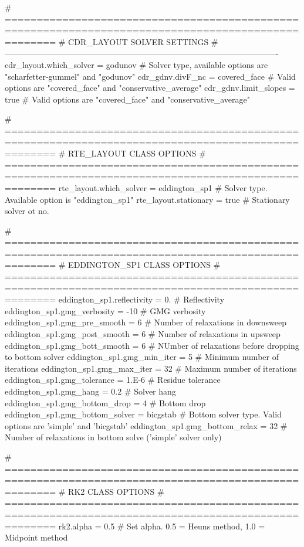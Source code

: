 \begin{DoxyVerb}
  # ====================================================================================================
  # CDR_LAYOUT SOLVER SETTINGS
  # ----------------------------------------------------------------------------------------------------
  cdr_layout.which_solver = godunov                # Solver type, available options are "scharfetter-gummel" and "godunov"
  cdr_gdnv.divF_nc        = covered_face           # Valid options are "covered_face" and "conservative_average"
  cdr_gdnv.limit_slopes   = true                   # Valid options are "covered_face" and "conservative_average"

  # ====================================================================================================
  # RTE_LAYOUT CLASS OPTIONS
  # ====================================================================================================
  rte_layout.which_solver = eddington_sp1 # Solver type. Available option is "eddington_sp1"
  rte_layout.stationary   = true          # Stationary solver ot no.

  # ====================================================================================================
  # EDDINGTON_SP1 CLASS OPTIONS
  # ====================================================================================================
  eddington_sp1.reflectivity      = 0.        # Reflectivity
  eddington_sp1.gmg_verbosity     = -10       # GMG verbosity
  eddington_sp1.gmg_pre_smooth    = 6         # Number of relaxations in downsweep
  eddington_sp1.gmg_post_smooth   = 6         # Number of relaxations in upsweep
  eddington_sp1.gmg_bott_smooth   = 6         # NUmber of relaxations before dropping to bottom solver
  eddington_sp1.gmg_min_iter      = 5         # Minimum number of iterations
  eddington_sp1.gmg_max_iter      = 32        # Maximum number of iterations
  eddington_sp1.gmg_tolerance     = 1.E-6     # Residue tolerance
  eddington_sp1.gmg_hang          = 0.2       # Solver hang
  eddington_sp1.gmg_bottom_drop   = 4         # Bottom drop
  eddington_sp1.gmg_bottom_solver = bicgstab  # Bottom solver type. Valid options are 'simple' and 'bicgstab'
  eddington_sp1.gmg_bottom_relax  = 32        # Number of relaxations in bottom solve ('simple' solver only)

  # ====================================================================================================
  # RK2 CLASS OPTIONS
  # ====================================================================================================
  rk2.alpha = 0.5 # Set alpha. 0.5 = Heuns method, 1.0 = Midpoint method


\end{DoxyVerb}
